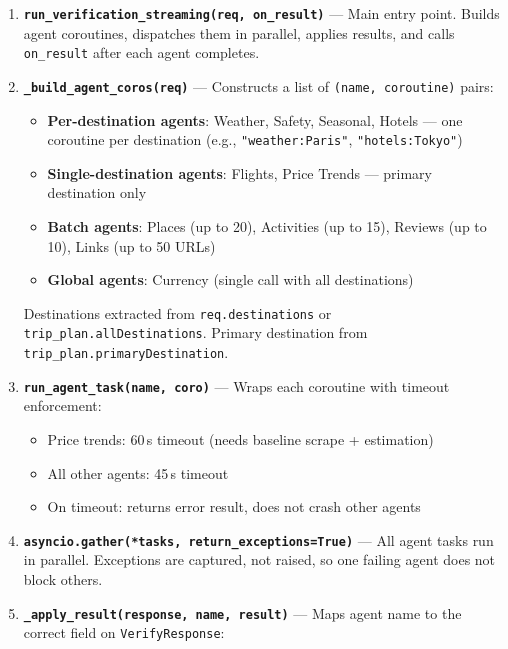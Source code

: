\documentclass[11pt,a4paper]{article}
\begin{document}
\begin{enumerate}
\item \textbf{\texttt{run\_verification\_streaming(req, on\_result)}} --- Main entry point. Builds agent coroutines, dispatches them in parallel, applies results, and calls \texttt{on\_result} after each agent completes.

\item \textbf{\texttt{\_build\_agent\_coros(req)}} --- Constructs a list of \texttt{(name, coroutine)} pairs:
\begin{itemize}[nosep]
\item \textbf{Per-destination agents}: Weather, Safety, Seasonal, Hotels --- one coroutine per destination (e.g., \texttt{"weather:Paris"}, \texttt{"hotels:Tokyo"})
\item \textbf{Single-destination agents}: Flights, Price Trends --- primary destination only
\item \textbf{Batch agents}: Places (up to 20), Activities (up to 15), Reviews (up to 10), Links (up to 50 URLs)
\item \textbf{Global agents}: Currency (single call with all destinations)
\end{itemize}
Destinations extracted from \texttt{req.destinations} or \texttt{trip\_plan.allDestinations}. Primary destination from \texttt{trip\_plan.primaryDestination}.

\item \textbf{\texttt{run\_agent\_task(name, coro)}} --- Wraps each coroutine with timeout enforcement:
\begin{itemize}[nosep]
\item Price trends: 60\,s timeout (needs baseline scrape + estimation)
\item All other agents: 45\,s timeout
\item On timeout: returns error result, does not crash other agents
\end{itemize}

\item \textbf{\texttt{asyncio.gather(*tasks, return\_exceptions=True)}} --- All agent tasks run in parallel. Exceptions are captured, not raised, so one failing agent does not block others.

\item \textbf{\texttt{\_apply\_result(response, name, result)}} --- Maps agent name to the correct field on \texttt{VerifyResponse}:
\end{enumerate}
\end{document}
